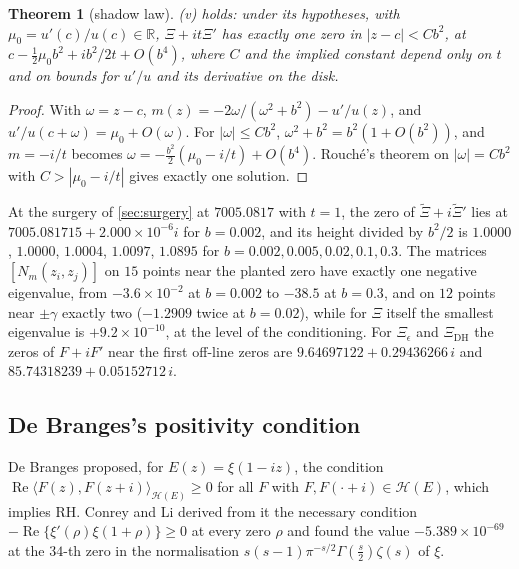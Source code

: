 \documentclass[11pt]{article}
\newtheorem{theorem}{Theorem}[section]
\theoremstyle{definition}\newtheorem{definition}[theorem]{Definition}
\theoremstyle{remark}\newtheorem{remark}[theorem]{Remark}
\newcommand{\R}{\mathbb R}\newcommand{\C}{\mathbb C}\newcommand{\N}{\mathbb N}
\renewcommand{\Re}{\operatorname{Re}}\renewcommand{\Im}{\operatorname{Im}}
\begin{document}
\begin{theorem}[shadow law]\label{thm:shadow}
(v) holds: under its hypotheses, with $\mu_0=u'(c)/u(c)\in\R$, $\Xi+it\Xi'$ has exactly one zero in $|z-c|<Cb^2$, at $c-\frac12\mu_0b^2+ib^2/2t+O(b^4)$, where $C$ and the implied constant depend only on $t$ and on bounds for $u'/u$ and its derivative on the disk.
\end{theorem}
\begin{proof}
With $\omega=z-c$, $m(z)=-2\omega/(\omega^2+b^2)-u'/u(z)$, and $u'/u(c+\omega)=\mu_0+O(\omega)$. For $|\omega|\le Cb^2$, $\omega^2+b^2=b^2(1+O(b^2))$, and $m=-i/t$ becomes $\omega=-\frac{b^2}2(\mu_0-i/t)+O(b^4)$. Rouch\'e's theorem on $|\omega|=Cb^2$ with $C>|\mu_0-i/t|$ gives exactly one solution.
\end{proof}

At the surgery of \cref{sec:surgery} at $7005.0817$ with $t=1$, the zero of $\widetilde\Xi+i\widetilde\Xi'$ lies at $7005.081715+2.000\times10^{-6}i$ for $b=0.002$, and its height divided by $b^2/2$ is $1.0000$, $1.0000$, $1.0004$, $1.0097$, $1.0895$ for $b=0.002,0.005,0.02,0.1,0.3$. The matrices $[N_m(z_i,z_j)]$ on $15$ points near the planted zero have exactly one negative eigenvalue, from $-3.6\times10^{-2}$ at $b=0.002$ to $-38.5$ at $b=0.3$, and on $12$ points near $\pm\gamma$ exactly two ($-1.2909$ twice at $b=0.02$), while for $\Xi$ itself the smallest eigenvalue is $+9.2\times10^{-10}$, at the level of the conditioning. For $\Xi_\epsilon$ and $\Xi_{\mathrm{DH}}$ the zeros of $F+iF'$ near the first off-line zeros are $9.64697122+0.29436266\,i$ and $85.74318239+0.05152712\,i$.

\subsection{De Branges's positivity condition}
De Branges \cite{deBranges86} proposed, for $E(z)=\xi(1-iz)$, the condition $\Re\langle F(z),F(z+i)\rangle_{\mathcal H(E)}\ge0$ for all $F$ with $F,F(\cdot+i)\in\mathcal H(E)$, which implies RH. Conrey and Li \cite{CL} derived from it the necessary condition $-\Re\{\xi'(\rho)\xi(1+\rho)\}\ge0$ at every zero $\rho$ and found the value $-5.389\times10^{-69}$ at the $34$-th zero in the normalisation $s(s-1)\pi^{-s/2}\Gamma(\frac s2)\zeta(s)$ of $\xi$.
\end{document}
